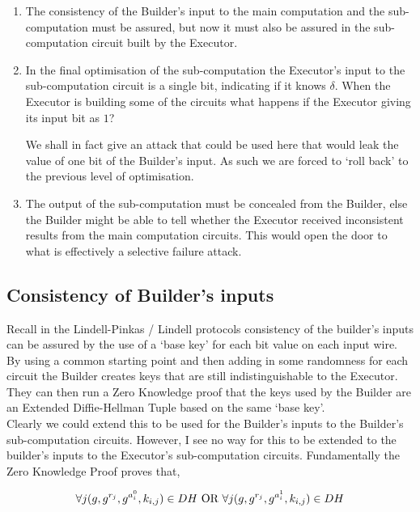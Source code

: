 \documentclass[ %
                    author={Nicholas Tutte},
                supervisor={Prof. Nigel Smart},
                    degree={MEng},
                     title={Secure Two Party Computation},
                  subtitle={A practical comparison of recent protocols},
                      type={Research - GG1K},
                      year={2015} ]{dissertation}
\begin{document}
				\begin{enumerate}
					\item The consistency of the Builder's input to the main computation and the sub-computation must be assured, but now it must also be assured in the sub-computation circuit built by the Executor.

					\item In the final optimisation of the sub-computation the Executor's input to the sub-computation circuit is a single bit, indicating if it knows $\delta$. When the Executor is building some of the circuits what happens if the Executor giving its input bit as $1$?

					We shall in fact give an attack that could be used here that would leak the value of one bit of the Builder's input. As such we are forced to `roll back' to the previous level of optimisation.

					\item The output of the sub-computation must be concealed from the Builder, else the Builder might be able to tell whether the Executor received inconsistent results from the main computation circuits. This would open the door to what is effectively a selective failure attack.

				\end{enumerate}


			\subsection{Consistency of Builder's inputs}
				Recall in the Lindell-Pinkas / Lindell protocols consistency of the builder's inputs can be assured by the use of a `base key' for each bit value on each input wire. By using a common starting point and then adding in some randomness for each circuit the Builder creates keys that are still indistinguishable to the Executor. They can then run a Zero Knowledge proof that the keys used by the Builder are an Extended Diffie-Hellman Tuple based on the same `base key'.\\

				Clearly we could extend this to be used for the Builder's inputs to the Builder's sub-computation circuits. However, I see no way for this to be extended to the builder's inputs to the Executor's sub-computation circuits. Fundamentally the Zero Knowledge Proof proves that,
				
				$$\forall j (g, g^{r_j}, g^{a_i^0}, k_{i,j}) \in DH \textnormal{ OR } \forall j (g, g^{r_j}, g^{a_i^1}, k_{i,j}) \in DH$$
				
\end{document}
